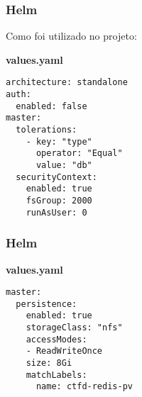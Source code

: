 \begin{frame}[containsverbatim]
\frametitle{Helm}
Como foi utilizado no projeto:
\begin{center}
\begin{minipage}{0.9\textwidth}
\begin{block}{\textbf{values.yaml}}
\begin{lstlisting}
architecture: standalone
auth:
  enabled: false
master:
  tolerations:
    - key: "type"
      operator: "Equal"
      value: "db"
  securityContext:
    enabled: true
    fsGroup: 2000
    runAsUser: 0
\end{lstlisting}
\end{block}
\end{minipage}
\end{center}
\end{frame}

\begin{frame}[containsverbatim]
\frametitle{Helm}
\begin{center}
\begin{minipage}{0.9\textwidth}
\begin{block}{\textbf{values.yaml}}
\begin{lstlisting}
master:
  persistence:
    enabled: true
    storageClass: "nfs"
    accessModes:
    - ReadWriteOnce
    size: 8Gi
    matchLabels:
      name: ctfd-redis-pv
\end{lstlisting}
\end{block}
\end{minipage}
\end{center}
\end{frame}
